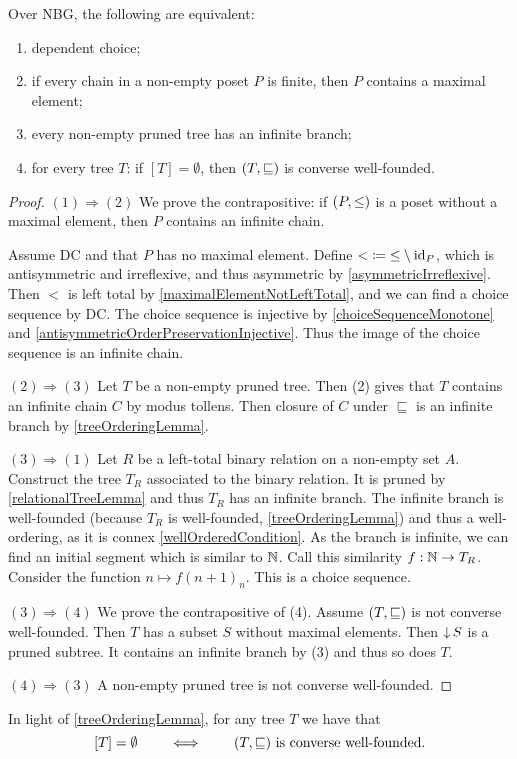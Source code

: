 \begin{proposition} \label{ZornEquivalentsDC}
Over NBG, the following are equivalent:
\begin{enumerate}
\item dependent choice;
\item if every chain in a non-empty poset $P$ is finite, then $P$ contains a maximal element;
\item every non-empty pruned tree has an infinite branch;
\item for every tree $T$: if $[T] = \emptyset$, then $\left( T,\sqsubseteq \right)$ is converse well-founded.
\end{enumerate}
\end{proposition}
\begin{proof}
$(1) \Rightarrow (2)$ We prove the contrapositive: if $\left( P, \leq \right)$ is a poset without a maximal element, then $P$ contains an infinite chain.

Assume DC and that $P$ has no maximal element. Define ${<} \coloneqq {\leq} \setminus\operatorname{id}_P$, which is antisymmetric and irreflexive, and thus asymmetric by \ref{asymmetricIrreflexive}. Then $<$ is left total by \ref{maximalElementNotLeftTotal}, and we can find a choice sequence by DC. The choice sequence is injective by \ref{choiceSequenceMonotone} and \ref{antisymmetricOrderPreservationInjective}. Thus the image of the choice sequence is an infinite chain.

$(2) \Rightarrow (3)$ Let $T$ be a non-empty pruned tree. Then (2) gives that $T$ contains an infinite chain $C$ by modus tollens. Then closure of $C$ under $\sqsubseteq$ is an infinite branch by \ref{treeOrderingLemma}.

$(3) \Rightarrow (1)$ Let $R$ be a left-total binary relation on a non-empty set $A$. Construct the tree $T_R$ associated to the binary relation. It is pruned by \ref{relationalTreeLemma} and thus $T_R$ has an infinite branch. The infinite branch is well-founded (because $T_R$ is well-founded, \ref{treeOrderingLemma}) and thus a well-ordering, as it is connex \ref{wellOrderedCondition}. As the branch is infinite, we can find an initial segment which is similar to $\mathbb{N}$. Call this similarity $f: \mathbb{N} \to T_R$. Consider the function $n\mapsto f(n+1)_{n}$. This is a choice sequence.

$(3) \Rightarrow (4)$ We prove the contrapositive of (4). Assume $\left( T,\sqsubseteq \right)$ is not converse well-founded. Then $T$ has a subset $S$ without maximal elements. Then $\operatorname{\downarrow} S$ is a pruned subtree. It contains an infinite branch by (3) and thus so does $T$.

$(4) \Rightarrow (3)$ A non-empty pruned tree is not converse well-founded.
\end{proof}
In light of \ref{treeOrderingLemma}, for any tree $T$ we have that
\[ [T] = \emptyset \qquad\iff\qquad \text{$\left( T,\sqsubseteq \right)$ is converse well-founded.} \]

